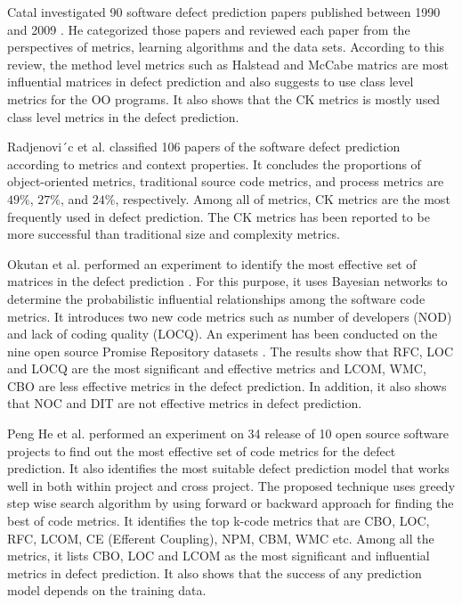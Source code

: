 \documentclass[12pt]{report}
\begin{document}
Catal investigated 90 software defect prediction papers published between 1990 and 2009 \cite{catal2009systematic}. He categorized those papers and reviewed each paper from the perspectives of metrics, learning algorithms and the data sets. According to this review, the method level metrics such as Halstead \cite{halstead1977elements} and McCabe \cite{mccabe1976complexity} matrics are most influential matrices in defect prediction and also suggests to use class level metrics for the OO programs. It also shows that the CK metrics is mostly used class level metrics in the defect prediction. 
 
Radjenovi´c et al. \cite{radjenovic2013software} classified 106 papers of the software defect prediction according to metrics and context properties. It concludes the proportions of object-oriented metrics, traditional source code metrics, and process metrics are $49\%$, $27\%$, and $24\%$, respectively. Among all of metrics, CK \cite{chidamber1994metrics} metrics are the most frequently used in defect prediction. The CK metrics has been reported to be more successful than traditional size and complexity metrics. 

Okutan et al. performed an experiment to identify the most effective set of matrices in the defect prediction \cite{okutan2014software}. For this purpose, it uses Bayesian networks to determine the probabilistic influential relationships among the software code metrics. It introduces two new code metrics such as number of developers (NOD) and lack of coding quality (LOCQ). An experiment has been conducted on the nine open source Promise Repository  datasets \cite{promise12}. The results show that RFC, LOC and LOCQ are the most significant and effective metrics and LCOM, WMC, CBO are less effective metrics in the defect prediction. In addition, it also shows that NOC and DIT are not effective metrics in defect prediction. 

Peng He et al. \cite{he2015empirical} performed an experiment on 34 release of 10 open source software projects to find out the most effective set of code metrics for the defect prediction. It also identifies the most suitable defect prediction model that works well in both within project and cross project. The proposed technique uses greedy step wise search algorithm by using forward or backward approach for finding the best of code metrics. It identifies the top k-code metrics that are CBO, LOC, RFC, LCOM, CE (Efferent Coupling), NPM, CBM, WMC etc. Among all the metrics, it lists CBO, LOC and LCOM as the most significant and influential metrics in defect prediction. It also shows that the success of any prediction model depends on the training data.
\end{document}
